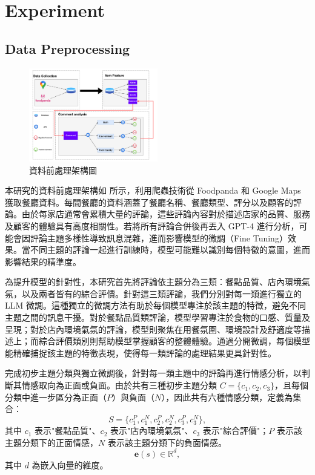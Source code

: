 \section{Experiment}
    \subsection{Data Preprocessing}
        \begin{figure}[tbh]
            \centering
            \includegraphics[width=0.5\textwidth]{img/preprocess.pdf}
            \caption{資料前處理架構圖}
            \label{fig-preprocess}
        \end{figure}
        本研究的資料前處理架構如  所示，利用爬蟲技術從 Foodpanda 和 Google Maps 獲取餐廳資料。每間餐廳的資料涵蓋了餐廳名稱、餐廳類型、評分以及顧客的評論。由於每家店通常會累積大量的評論，這些評論內容對於描述店家的品質、服務及顧客的體驗具有高度相關性。若將所有評論合併後再丟入 GPT-4 進行分析，可能會因評論主題多樣性導致訊息混雜，進而影響模型的微調（Fine Tuning）效果。當不同主題的評論一起進行訓練時，模型可能難以識別每個特徵的意圖，進而影響結果的精準度。

        為提升模型的針對性，本研究首先將評論依主題分為三類：餐點品質、店內環境氣氛，以及兩者皆有的綜合評價。針對這三類評論，我們分別對每一類進行獨立的 LLM 微調。這種獨立的微調方法有助於每個模型專注於該主題的特徵，避免不同主題之間的訊息干擾。對於餐點品質類評論，模型學習專注於食物的口感、質量及呈現；對於店內環境氣氛的評論，模型則聚焦在用餐氛圍、環境設計及舒適度等描述上；而綜合評價類別則幫助模型掌握顧客的整體體驗。通過分開微調，每個模型能精確捕捉該主題的特徵表現，使得每一類評論的處理結果更具針對性。\color{blue}

        完成初步主題分類與獨立微調後，針對每一類主題中的評論再進行情感分析，以判斷其情感取向為正面或負面。由於共有三種初步主題分類 \( C = \{ c_1, c_2, c_3 \} \)，且每個分類中進一步區分為正面（\( P \)）與負面（\( N \)），因此共有六種情感分類，定義為集合：
        \begin{equation}
            S = \{ c_1^P, c_1^N, c_2^P, c_2^N, c_3^P, c_3^N \},
            \label{eq-classification}
        \end{equation}
        其中 \( c_1 \) 表示"餐點品質"、\( c_2 \) 表示"店內環境氣氛"、\( c_3 \) 表示"綜合評價"；\( P \) 表示該主題分類下的正面情感，\( N \) 表示該主題分類下的負面情感。
        \[
        \mathbf{e}(s) \in \mathbb{R}^d,
        \]
        其中 \( d \) 為嵌入向量的維度。
        
